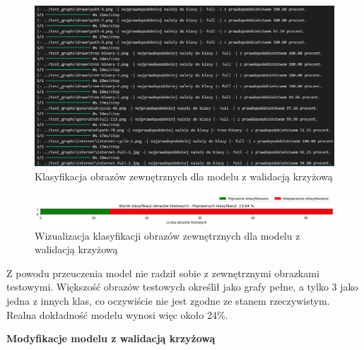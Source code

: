 \begin{figure}[ht]
	\centering
	\includegraphics[width=14cm]{resources/tests/images/v3/crossvalid_txt.png}
	\caption{Klasyfikacja obrazów zewnętrznych dla modelu z walidacją krzyżową}
	\label{Fig:tests-cv-0b}
\end{figure}
\FloatBarrier

\begin{figure}[ht]
	\centering
	\includegraphics[width=14cm]{resources/tests/images/v3/crossvalid_bar.png}
	\caption{Wizualizacja klasyfikacji obrazów zewnętrznych dla modelu z walidacją krzyżową}
	\label{Fig:tests-cv-0c}
\end{figure}
\FloatBarrier

Z powodu przeuczenia model nie radził sobie z zewnętrznymi obrazkami testowymi.
Większość obrazów testowych określił jako grafy pełne, a tylko 3 jako jedna z innych klas,
co oczywiście nie jest zgodne ze stanem rzeczywistym.
Realna dokładność modelu wynosi więc około 24\%.

\textbf{Modyfikacje modelu z walidacją krzyżową}

